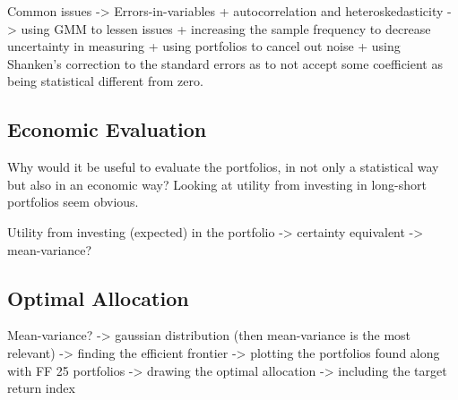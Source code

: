 Common issues -> Errors-in-variables + autocorrelation and heteroskedasticity -> using GMM to lessen issues  + increasing the sample frequency to decrease uncertainty in measuring + using portfolios to cancel out noise + using Shanken's correction to the standard errors as to not accept some coefficient as being statistical different from zero.

\subsection{Economic Evaluation}

Why would it be useful to evaluate the portfolios, in not only a statistical way but also in an economic way? Looking at utility from investing in long-short portfolios seem obvious.

Utility from investing (expected) in the portfolio -> certainty equivalent -> mean-variance?

\subsection{Optimal Allocation}

Mean-variance? -> gaussian distribution (then mean-variance is the most relevant) -> finding the efficient frontier -> plotting the portfolios found along with FF 25 portfolios -> drawing the optimal allocation -> including the target return index




